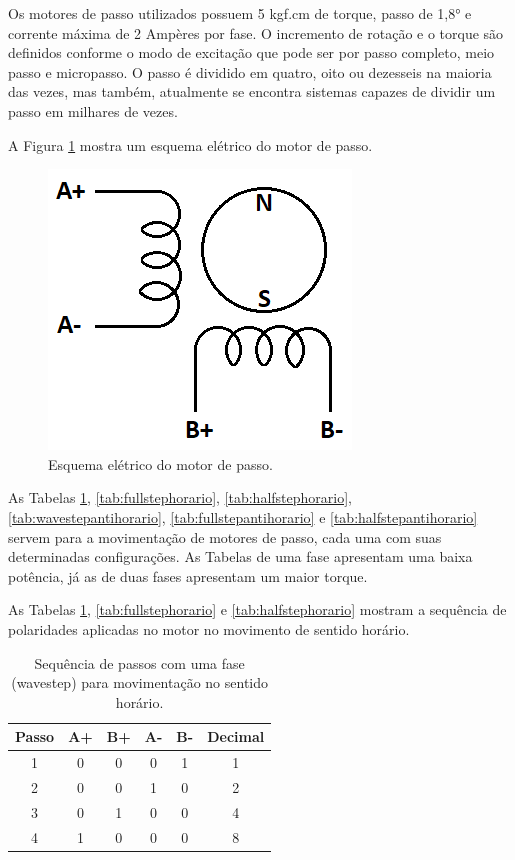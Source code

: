 Os motores de passo utilizados possuem 5 kgf.cm de torque, passo de 1,8° e 
corrente máxima de 2 Ampères por fase. O incremento de rotação e o torque são definidos conforme o modo 
de excitação que pode ser por passo completo, meio passo e micropasso. O passo 
é dividido em quatro, oito ou dezesseis na maioria das vezes, mas também, atualmente se encontra 
sistemas capazes de dividir um passo em milhares de vezes.

A Figura \ref{fig:meumotorbipolar} mostra um esquema elétrico do motor de passo.

\begin{figure}[H]
\centering
\caption{Esquema elétrico do motor de passo.}\label{fig:meumotorbipolar}
\includegraphics[scale = 0.6]{figuras/meumotorbipolar}
\end{figure}

As Tabelas \ref{tab:wavestephorario}, \ref{tab:fullstephorario}, \ref{tab:halfstephorario},
\ref{tab:wavestepantihorario}, \ref{tab:fullstepantihorario} e \ref{tab:halfstepantihorario} 
servem para a movimentação de motores de passo, cada uma com suas determinadas configurações.
As Tabelas de uma fase apresentam uma baixa potência, já as de duas fases apresentam um maior torque.

As Tabelas \ref{tab:wavestephorario}, \ref{tab:fullstephorario} e \ref{tab:halfstephorario} 
mostram a sequência de polaridades aplicadas no motor no movimento de sentido horário.

\begin{table}[H]
    \footnotesize
    \centering
    \caption{Sequência de passos com uma fase (wavestep) para movimentação no sentido horário.}
    \begin{tabular}{cccccc}
        \hline
        \textbf{Passo} & \textbf{A+} & \textbf{B+} & \textbf{A-} & \textbf{B-} & \textbf{Decimal}\\
        \hline
        1 & 0 & 0 & 0 & 1 & 1\\
        2 & 0 & 0 & 1 & 0 & 2\\
        3 & 0 & 1 & 0 & 0 & 4\\
        4 & 1 & 0 & 0 & 0 & 8\\        
        \hline       
    \end{tabular}
    \label{tab:wavestephorario}
\end{table}

